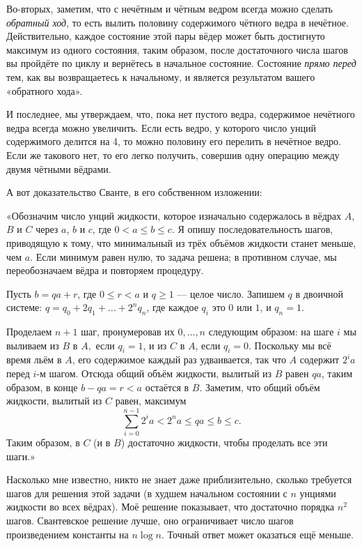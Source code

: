 Во-вторых, заметим, что с нечётным и чётным ведром всегда можно сделать \emph{обратный ход}, то есть вылить половину содержимого чётного ведра в нечётное.
Действительно, каждое состояние этой пары вёдер может быть достигнуто максимум из одного состояния, таким образом, после достаточного числа шагов вы пройдёте по циклу и вернётесь в начальное состояние.
Состояние \emph{прямо перед} тем, как вы возвращаетесь к начальному, и является результатом вашего «обратного хода».

И последнее, мы утверждаем, что, пока нет пустого ведра, содержимое нечётного ведра всегда можно увеличить.
Если есть ведро, у которого число унций содержимого делится на 4, то можно половину его перелить в нечётное ведро.
Если же такового нет, то его легко получить, совершив одну операцию между двумя чётными вёдрами.
\heart

А вот доказательство Сванте, в его собственном изложении:

\medskip

«Обозначим число унций жидкости, которое изначально содержалось в вёдрах $A$, $B$ и $C$ через $a$, $b$ и $c$, где $0<a\le b\le c$.
Я опишу последовательность шагов, приводящую к тому, что минимальный из трёх объёмов жидкости станет меньше, чем $a$.
Если минимум равен нулю, то задача решена; в противном случае, мы переобозначаем вёдра и повторяем процедуру.

Пусть $b = qa + r$, где $0\le r<a$ и $q\ge 1$ --- целое число.
Запишем $q$ в двоичной системе: $q=q_0+2q_1+\dots+2^nq_n$, где каждое $q_i$ это $0$ или $1$, и $q_n = 1$.

Проделаем $n+1$ шаг, пронумеровав их $0,\dots, n$ следующим образом: на шаге $i$ мы выливаем из $B$ в $A,$ если $q_i = 1$, и из $C$ в $A$, если $q_i = 0$.
Поскольку мы всё время льём в $A$, его содержимое каждый раз удваивается, так что $A$ содержит $2^ia$ перед $i$-м шагом.
Отсюда общий объём жидкости, вылитый из $B$ равен $qa$, таким образом, в конце $b-qa=r<a$ остаётся в $B$.
Заметим, что общий объём жидкости, вылитый из $C$ равен, максимум
\[\sum_{i=0}^{n-1} 2^ia<2^na\le qa\le b\le c.\]
Таким образом, в $C$ (и в $B$) достаточно жидкости, чтобы проделать все эти шаги.»
\heart

Насколько мне известно, никто не знает даже приблизительно, сколько требуется шагов для решения этой задачи (в худшем начальном состоянии с $n$ унциями жидкости во всех вёдрах).
Моё решение показывает, что достаточно порядка $n^2$ шагов.
Свантевское  решение лучше, оно ограничивает число шагов произведением константы на $n\log n$.
Точный ответ может оказаться ещё меньше.

